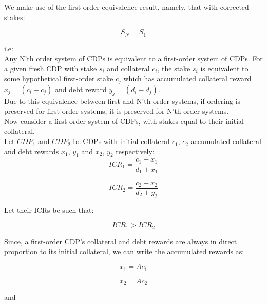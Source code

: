 \documentclass[reqno]{article}
\begin{document}
We make use of the first-order equivalence result, namely, that with corrected stakes:

\begin{equation} 
    S_N = S_1
\end{equation}

i.e:\\

Any N’th order system of CDPs is equivalent to a first-order system of CDPs. For a given fresh CDP with stake $s_i$ and collateral $c_i$, the stake $s_i$ is equivalent to some hypothetical first-order stake $c_j$ which has accumulated collateral reward $x_j = (c_i - c_j)$ and debt reward $y_j = (d_i - d_j)$.\\

Due to this equivalence between first and N’th-order systems, if ordering is preserved for first-order systems, it is preserved for N’th order systems.\\

Now consider a first-order system of CDPs, with stakes equal to their initial collateral.\\

Let $CDP_1$ and $CDP_2$ be CDPs with initial collateral $c_1$, $c_2$ accumulated collateral and debt rewards $x_1$, $y_1$ and $x_2$, $y_2$ respectively:\\

\begin{equation} 
    ICR_1=\frac{c_1+x_1}{d_1+x_1}
\end{equation}

\begin{equation} 
    ICR_2=\frac{c_2+x_2}{d_2+y_2}
\end{equation}

Let their ICRs be such that:

\begin{equation} 
    ICR_1 > ICR_2
\end{equation}

\bigskip
Since, a first-order CDP’s collateral and debt rewards are always in direct proportion to its initial collateral, we can write the accumulated rewards as:

\begin{equation} 
    x_1=Ac_1
\end{equation}

\begin{equation} 
    x_2=Ac_2
\end{equation}

and
\end{document}
